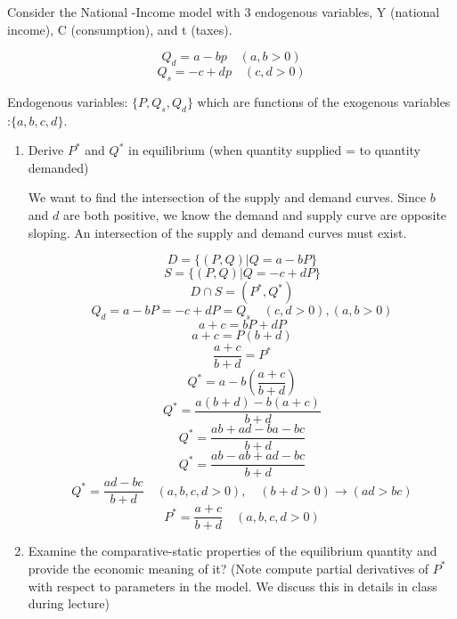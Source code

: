 \documentclass[12pt]{article}
\newcounter{ques}
\newenvironment{question}{\stepcounter{ques}{\noindent\bf Question \arabic{ques}:}}{\vspace{5mm}}
\begin{document}
\begin{question}
      Consider the National -Income model with 3 endogenous variables, Y (national income), C (consumption), and t (taxes).

      $$Q_d = a-bp \quad (a, b> 0)$$
      $$Q_s = -c +dp \quad (c, d > 0)$$

      Endogenous variables:  $\{P, Q_s, Q_d\}$ which are functions of the exogenous variables :$\{a,b,c,d\}$.
     


      \begin{enumerate}[label=(\alph*)]
            \item Derive $P^*$ and $Q^*$ in equilibrium (when quantity supplied = to quantity demanded)
      
            We want to find the intersection of the supply and demand curves. Since $b$ and $d$ are both positive, we know the demand 
            and supply curve are opposite sloping. An intersection of the supply and demand curves must exist.

            $$D = \{(P,Q) | Q = a-bP\} $$
            $$S = \{(P,Q) | Q = -c +dP\} $$
            $$D \cap S = (P^*, Q^*)$$
            $$  Q_d = a-bP = -c +dP = Q_s \quad (c, d > 0), (a, b > 0)$$
            $$   a + c = bP +dP  $$
            $$   a + c = P(b +d)  $$
            $$   \frac{a + c}{b +d} = P^* $$
            $$ Q^* = a-b\left(\frac{a + c}{b +d}\right) $$
            $$ Q^* = \frac{a(b + d) - b(a + c)}{b +d} $$
            $$ Q^* = \frac{ab +ad - ba - bc}{b +d} $$
            $$ Q^* = \frac{ab - ab +ad - bc}{b +d} $$
            $$ Q^* = \frac{ad - bc}{b +d} \quad (a, b, c, d > 0),\quad (b+d > 0) \rightarrow (ad > bc)$$
            $$  P^* = \frac{a + c}{b +d}  \quad (a, b, c, d > 0)$$

            \item Examine the comparative-static properties of the equilibrium quantity and provide the economic meaning
            of it? (Note compute partial derivatives 
            of $P^*$ with respect to parameters in the model. We discuss this in details in class during lecture)


\end{enumerate}
\end{question}
\end{document}
